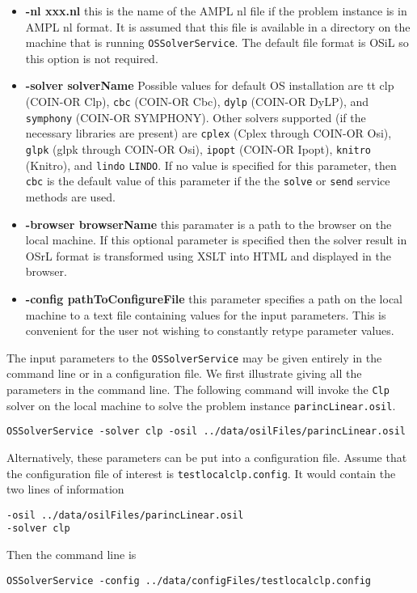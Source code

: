 \documentclass[11pt]{article}
\renewcommand{\_}{{\char"5F}}
\renewcommand{\{}{{\char"7B}}
\renewcommand{\}}{{\char"7D}}
\renewcommand{\^}{{\char"0D}}
\renewcommand{\'}{{\char"0D}}
\begin{document}
\begin{itemize}
\item[] {\bf -nl  xxx.nl}  this is the name of the AMPL nl file if the problem instance is in AMPL nl  format. It is assumed that this file is available in a directory on the machine that is running {\tt OSSolverService}. The default file format is OSiL so this option is not required.

\item[] {\bf -solver  solverName}  Possible values for default OS installation are {tt clp} (COIN-OR Clp), {\tt cbc} (COIN-OR Cbc), {\tt dylp} (COIN-OR DyLP), and {\tt symphony} (COIN-OR SYMPHONY). Other solvers supported (if the necessary libraries are present) are {\tt cplex} (Cplex through COIN-OR Osi), {\tt glpk} (glpk through COIN-OR Osi), {\tt ipopt} (COIN-OR Ipopt),  {\tt knitro} (Knitro), and {\tt lindo} {\tt LINDO}. If no value is specified for this parameter, then {\tt cbc} is the default value of this parameter if the the {\tt solve} or {\tt send} service methods are used.


\item[] {\bf -browser  browserName} this paramater is a path to the browser on the local machine. If this optional parameter is specified then the solver result in OSrL format is transformed using XSLT into HTML and displayed in the browser. 

\item[] {\bf -config pathToConfigureFile} this parameter specifies a path on the local machine to a text file containing values for the input parameters. This is convenient for the user not wishing to constantly retype parameter values.

\end{itemize}



The input parameters to the {\tt OSSolverService} may be given entirely in the command line or in a configuration file.  We first illustrate giving all the  parameters in the command line. The following command will invoke the {\tt Clp} solver on the local machine to solve the problem instance {\tt parincLinear.osil}.

\begin{verbatim}
OSSolverService -solver clp -osil ../data/osilFiles/parincLinear.osil 
\end{verbatim}

Alternatively, these parameters can be put into a configuration file. Assume that the configuration file of interest is {\tt testlocalclp.config}. It would contain the two lines of information
\begin{verbatim}
-osil ../data/osilFiles/parincLinear.osil
-solver clp
\end{verbatim}
Then the command line is
\begin{verbatim}
OSSolverService -config ../data/configFiles/testlocalclp.config
\end{verbatim}
\end{document}
